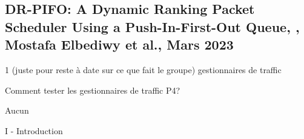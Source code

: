 
\subsection{DR-PIFO: A Dynamic Ranking Packet Scheduler Using a Push-In-First-Out Queue, \cite{elbediwy_dr-pifo_nodate}, Mostafa Elbediwy et al., Mars 2023}
 1 (juste pour reste à date sur ce que fait le groupe)
 gestionnaires de traffic

 Comment tester les gestionnaires de traffic P4?

 Aucun



I - Introduction


\clearpage
